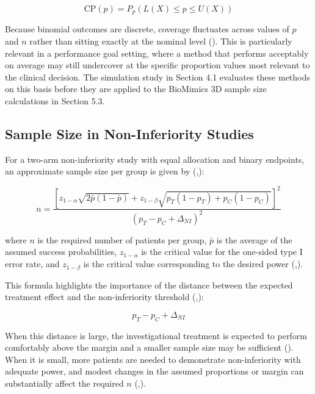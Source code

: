\documentclass{article}
\begin{document}
\[\text{CP}(p) = P_p\!\left(L(X) \leq p \leq U(X)\right)\]

Because binomial outcomes are discrete, coverage fluctuates across
values of \(p\) and \(n\) rather than sitting exactly at the nominal
level (). This is particularly
relevant in a performance goal setting, where a method that performs
acceptably on average may still undercover at the specific proportion
values most relevant to the clinical decision. The simulation study in
Section 4.1 evaluates these methods on this basis before they are
applied to the BioMimics 3D sample size calculations in Section 5.3.

\subsection{Sample Size in Non-Inferiority
Studies}\label{sample-size-in-non-inferiority-studies}

For a two-arm non-inferiority study with equal allocation and binary
endpoints, an approximate sample size per group is given by
(,):

\[n = \frac{\left[z_{1-\alpha}\sqrt{2\bar{p}(1-\bar{p})} + z_{1-\beta}\sqrt{p_T(1-p_T) + p_C(1-p_C)}\right]^2}{(p_T - p_C + \Delta_{NI})^2}\]

where \(n\) is the required number of patients per group, \(\bar{p}\) is
the average of the assumed success probabilities, \(z_{1-\alpha}\) is
the critical value for the one-sided type I error rate, and
\(z_{1-\beta}\) is the critical value corresponding to the desired power
(,).

This formula highlights the importance of the distance between the
expected treatment effect and the non-inferiority threshold
(,):

\[p_T - p_C + \Delta_{NI}\]

When this distance is large, the investigational treatment is expected
to perform comfortably above the margin and a smaller sample size may be
sufficient (). When it is small, more
patients are needed to demonstrate non-inferiority with adequate power,
and modest changes in the assumed proportions or margin can
substantially affect the required \(n\)
(,).
\end{document}
